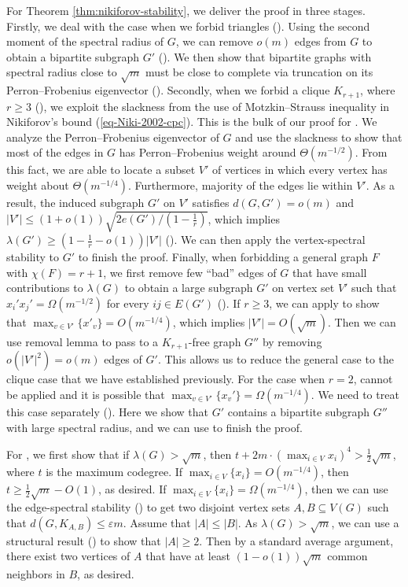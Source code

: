 \documentclass[11pt,a4paper]{article}
\theoremstyle{definition}
\theoremstyle{remark}
\begin{document}
For Theorem \ref{thm:nikiforov-stability}, we deliver the proof in three stages. Firstly, we deal with the case when we forbid triangles (). Using the second moment of the spectral radius of $G$, we can remove $o(m)$ edges from $G$ to obtain a bipartite subgraph $G'$ (). We then show that bipartite graphs with spectral radius close to $\sqrt{m}$ must be close to complete via truncation on its Perron--Frobenius eigenvector (). Secondly, when we forbid a clique $K_{r+1}$, where $r\ge 3$ (), we exploit the slackness from the use of Motzkin--Strauss inequality in Nikiforov's bound (\ref{eq-Niki-2002-cpc}). 
This is the bulk of our proof for . We analyze the Perron--Frobenius eigenvector of $G$ and use the slackness to show that most of the edges in $G$ has Perron--Frobenius weight around $\Theta(m^{-1/2})$. From this fact, we are able to locate a subset $V'$ of vertices in which every vertex has weight about $\Theta(m^{-1/4})$. Furthermore, majority of the edges lie within $V'$. As a result, the induced subgraph $G'$ on $V'$ satisfies $d(G,G')=o(m)$ and $|V'|\le (1+o(1))\sqrt{2e(G')/(1-\frac{1}{r})}$, which implies $\lambda (G')\ge \left(1- \frac{1}{r} - o(1) \right)|V'|$ (). We can then apply the vertex-spectral stability to $G'$ to finish the proof. Finally, when forbidding a general graph $F$ with $\chi (F)=r+1$, we first remove few ``bad'' edges of $G$ that have small contributions to $\lambda (G)$ to obtain a large subgraph $G'$ on vertex set $V'$ such that $x_i'x_j'=\Omega (m^{-1/2})$ for every $ij\in E(G')$ (). If $r\ge 3$, we can apply  to show that $\max_{v\in V'}\{x'_v\}=O(m^{-1/4})$, which implies $|V'|=O(\sqrt{m})$.  
Then we can use removal lemma to pass to a $K_{r+1}$-free graph $G''$ by removing $o(|V'|^2)=o(m)$ edges of $G'$. This allows us to reduce the general case to the clique case that we have established previously. For the case when $r=2$,  cannot be applied and 
it is possible that $\max_{v\in V'}\{x_v'\}=\Omega(m^{-1/4})$. 
We need to treat this case separately (). Here we show that $G'$ contains a bipartite subgraph $G''$ with large spectral radius, and we can use  to finish the proof. 

For , we first show that if 
$\lambda(G)> \sqrt{m}$, then 
$t+ 2m\cdot (\max_{i\in V} x_i)^4 >\frac{1}{2} \sqrt{m}$, where $t$ is the maximum codegree. If $\max_{i\in V} \{x_i\} = O(m^{-1/4})$, then $t\ge \frac{1}{2}\sqrt{m} - O(1)$, as desired. If $\max_{i\in V}\{x_i\} =\Omega (m^{-1/4})$, then we can use the edge-spectral stability () to get two disjoint vertex sets $A,B\subseteq V(G)$ such that $d(G,K_{A,B})\le \varepsilon m$. Assume that $|A|\le |B|$. As $\lambda(G)> \sqrt{m}$, we can use a structural result () to show that $|A|\ge 2$. Then by a standard average argument, there exist two vertices of $A$ that have at least $(1-o(1))\sqrt{m}$ common neighbors in $B$, as desired.
\end{document}
